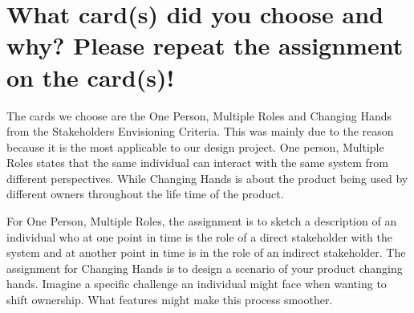 \section{What card(s) did you choose and why? Please repeat the assignment on the card(s)!}

The cards we choose are the One Person, Multiple Roles and Changing Hands from the Stakeholders Envisioning Criteria. This was mainly due to the reason because it is the most applicable to our design project. One person, Multiple Roles states that the same individual can interact with the same system from different perspectives. While Changing Hands is about the product being used by different owners throughout the life time of the product. 

For One Person, Multiple Roles, the assignment is to sketch a description of an individual who at one point in time is the role of a direct stakeholder with the system and at another point in time is in the role of an indirect stakeholder. The assignment for Changing Hands is to design a scenario of your product changing hands. Imagine a specific challenge an individual might face when wanting to shift ownership. What features might make this process smoother. 
